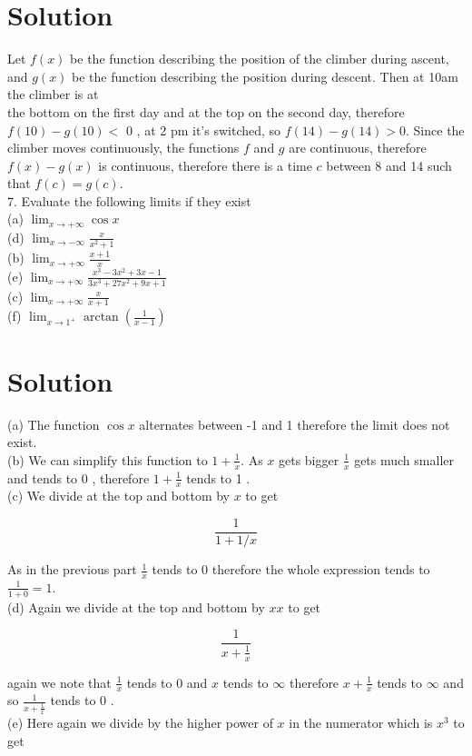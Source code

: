 \documentclass[10pt]{article}
\begin{document}
\section*{Solution}
Let $f(x)$ be the function describing the position of the climber during ascent, and $g(x)$ be the function describing the position during descent. Then at 10am the climber is at\\
the bottom on the first day and at the top on the second day, therefore $f(10)-g(10)<$ 0 , at 2 pm it's switched, so $f(14)-g(14)>0$. Since the climber moves continuously, the functions $f$ and $g$ are continuous, therefore $f(x)-g(x)$ is continuous, therefore there is a time $c$ between 8 and 14 such that $f(c)=g(c)$.\\
7. Evaluate the following limits if they exist\\
(a) $\lim _{x \rightarrow+\infty} \cos x$\\
(d) $\lim _{x \rightarrow-\infty} \frac{x}{x^{2}+1}$\\
(b) $\lim _{x \rightarrow+\infty} \frac{x+1}{x}$\\
(e) $\lim _{x \rightarrow+\infty} \frac{x^{3}-3 x^{2}+3 x-1}{3 x^{3}+27 x^{2}+9 x+1}$\\
(c) $\lim _{x \rightarrow+\infty} \frac{x}{x+1}$\\
(f) $\lim _{x \rightarrow 1^{+}} \arctan \left(\frac{1}{x-1}\right)$

\section*{Solution}
(a) The function $\cos x$ alternates between -1 and 1 therefore the limit does not exist.\\
(b) We can simplify this function to $1+\frac{1}{x}$. As $x$ gets bigger $\frac{1}{x}$ gets much smaller and tends to 0 , therefore $1+\frac{1}{x}$ tends to 1 .\\
(c) We divide at the top and bottom by $x$ to get

$$
\frac{1}{1+1 / x}
$$

As in the previous part $\frac{1}{x}$ tends to 0 therefore the whole expression tends to $\frac{1}{1+0}=1$.\\
(d) Again we divide at the top and bottom by $x x$ to get

$$
\frac{1}{x+\frac{1}{x}}
$$

again we note that $\frac{1}{x}$ tends to 0 and $x$ tends to $\infty$ therefore $x+\frac{1}{x}$ tends to $\infty$ and so $\frac{1}{x+\frac{1}{x}}$ tends to 0 .\\
(e) Here again we divide by the higher power of $x$ in the numerator which is $x^{3}$ to get
\end{document}
